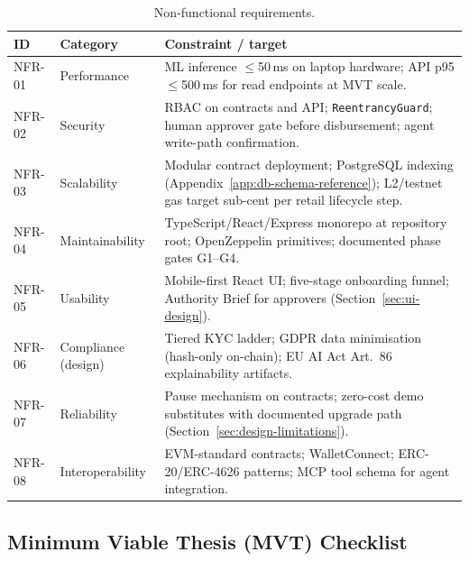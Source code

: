 \begin{table}[H]
\centering
\caption[Non-functional requirements]{Non-functional requirements.}
\label{tab:nonfunctional-requirements}
\small
\begin{tabular}{@{}p{1.2cm}p{2.4cm}p{10.6cm}@{}}
\toprule
\tableheadcolor
\textbf{ID} & \textbf{Category} & \textbf{Constraint / target} \\
\midrule
NFR-01 & Performance & ML inference $\leq$50\,ms on laptop hardware; API p95 $\leq$500\,ms for read endpoints at MVT scale. \\
NFR-02 & Security & RBAC on contracts and API; \texttt{ReentrancyGuard}; human approver gate before disbursement; agent write-path confirmation. \\
NFR-03 & Scalability & Modular contract deployment; PostgreSQL indexing (Appendix~\ref{app:db-schema-reference}); L2/testnet gas target sub-cent per retail lifecycle step. \\
NFR-04 & Maintainability & TypeScript/React/Express monorepo at repository root; OpenZeppelin primitives; documented phase gates G1--G4. \\
NFR-05 & Usability & Mobile-first React UI; five-stage onboarding funnel; Authority Brief for approvers (Section~\ref{sec:ui-design}). \\
NFR-06 & Compliance (design) & Tiered KYC ladder; GDPR data minimisation (hash-only on-chain); EU AI Act Art.~86 explainability artifacts. \\
NFR-07 & Reliability & Pause mechanism on contracts; zero-cost demo substitutes with documented upgrade path (Section~\ref{sec:design-limitations}). \\
NFR-08 & Interoperability & EVM-standard contracts; WalletConnect; ERC-20/ERC-4626 patterns; MCP tool schema for agent integration. \\
\bottomrule
\end{tabular}
\end{table}

\subsection{Minimum Viable Thesis (MVT) Checklist}
\label{sec:mvt-checklist}

